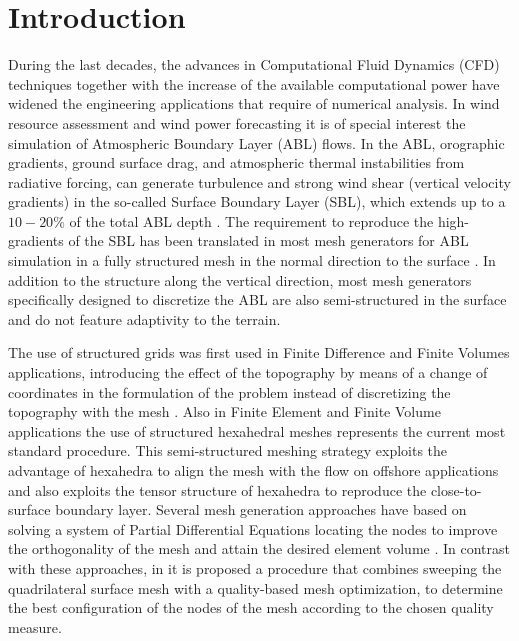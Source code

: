 \documentclass[1p]{elsarticle}
\begin{document}


\section{Introduction}
\label{sec:intro}

During the last decades, the advances in Computational Fluid Dynamics (CFD) techniques together with the increase of the available computational power have widened the engineering applications that require of numerical analysis.
In wind resource assessment and wind power forecasting it is of special interest the simulation of Atmospheric Boundary Layer (ABL) flows. In the ABL, orographic gradients, ground surface drag, and atmospheric thermal instabilities from radiative forcing, can generate turbulence and strong wind shear (vertical velocity gradients) in the so-called Surface Boundary Layer (SBL), which extends up to a $10-20\%$ of the total ABL depth \cite{kopp1984remote,garratt1994atmospheric,blocken2007cfd,wizelius2007developing,stull2012introduction}. 
The requirement to reproduce the high-gradients of the SBL has been translated in most mesh generators for ABL simulation in a fully structured mesh in the normal direction to the surface \cite{sorensen:hypgrid,sorensen:ellypsys3Dvalidation,openfoam:web,gargallo:meshForABLandWindFarms,gargallo2018JCP:WindFarms,zephy}.
In addition to the structure along the vertical direction, most mesh generators specifically designed to discretize the ABL \cite{sorensen:hypgrid,sorensen:ellypsys3Dvalidation,openfoam:web,gargallo:meshForABLandWindFarms,gargallo2018JCP:WindFarms} are also semi-structured in the surface and do not feature adaptivity to the terrain. 

The use of structured grids was first used in Finite Difference and Finite Volumes applications, introducing the effect of the topography by means of a change of coordinates in the formulation of the problem instead of discretizing the topography with the mesh \cite{haltiner:numericalMeteorology,arakawa:vertical}.
Also in Finite Element and Finite Volume applications the use of structured hexahedral meshes represents the current most standard procedure. This  semi-structured meshing strategy exploits the advantage of hexahedra to align the mesh with the flow on offshore applications and also exploits the tensor structure of hexahedra to reproduce the close-to-surface boundary layer.
Several mesh generation approaches have based on solving a system of Partial Differential Equations locating the nodes to improve the orthogonality of the mesh and attain the desired element volume \cite{michelsen:1994block,sorensen:hypgrid,sorensen:ellypsys3Dvalidation,marras:atmosphericStabilization}.
In contrast with these approaches, in \cite{gargallo:meshForABLandWindFarms,gargallo2018JCP:WindFarms} it is proposed a procedure that combines sweeping the quadrilateral surface mesh with a quality-based mesh optimization, to determine the best configuration of the nodes of the mesh according to the chosen quality measure.
\end{document}
